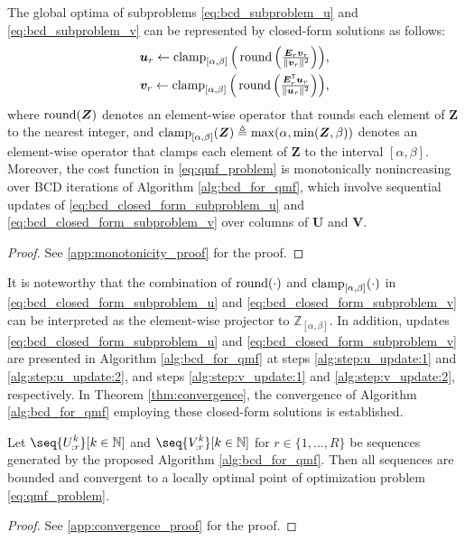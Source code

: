\begin{theorem}[Monotonicity] \label{the:bcd_subproblem}
    The global optima of subproblems \eqref{eq:bcd_subproblem_u} and \eqref{eq:bcd_subproblem_v} can be represented by closed-form solutions as follows:
    \begin{align}
        \textstyle \bm{u}_r \gets \operatorname{clamp}_{[\alpha,\beta]}\Big(\operatorname{round}\Big(\frac{\bm{E}_r \bm{v}_r}{\lVert \bm{v}_r \rVert^2}\Big)\Big), \label{eq:bcd_closed_form_subproblem_u} \\
        \textstyle \bm{v}_r \gets \operatorname{clamp}_{[\alpha,\beta]}\Big(\operatorname{round}\Big(\frac{\bm{E}_r^\mathsf{T} \bm{u}_r}{\lVert \bm{u}_r \rVert^2}\Big)\Big),
        \label{eq:bcd_closed_form_subproblem_v}
    \end{align}
    where $\operatorname{round}(\bm{Z})$ denotes an element-wise operator that rounds each element of $\bm{Z}$ to the nearest integer, and $\operatorname{clamp}_{[\alpha,\beta]}(\bm{Z}) \triangleq \max(\alpha, \min(\bm{Z}, \beta))$ denotes an element-wise operator that clamps each element of $\bm{Z}$ to the interval $[\alpha,\beta]$. Moreover, the cost function in \eqref{eq:qmf_problem} is monotonically nonincreasing over BCD iterations of Algorithm \ref{alg:bcd_for_qmf}, which involve sequential updates of \eqref{eq:bcd_closed_form_subproblem_u} and \eqref{eq:bcd_closed_form_subproblem_v} over columns of $\bm U$ and $\bm V$.
\end{theorem}
\begin{proof}
    See \ref{app:monotonicity_proof} for the proof.
\end{proof}

It is noteworthy that the combination of $\operatorname{round}(\cdot)$ and $\operatorname{clamp}_{[\alpha,\beta]}(\cdot)$ in \eqref{eq:bcd_closed_form_subproblem_u} and \eqref{eq:bcd_closed_form_subproblem_v} can be interpreted as the element-wise projector to $\mathbb{Z}_{[\alpha,\beta]}$. In addition, updates \eqref{eq:bcd_closed_form_subproblem_u} and \eqref{eq:bcd_closed_form_subproblem_v} are presented in Algorithm \ref{alg:bcd_for_qmf} at steps \ref{alg:step:u_update:1} and \ref{alg:step:u_update:2}, and steps \ref{alg:step:v_update:1} and \ref{alg:step:v_update:2}, respectively. In Theorem \ref{thm:convergence}, the convergence of Algorithm \ref{alg:bcd_for_qmf} employing these closed-form solutions is established.

\begin{theorem}[Convergence]\label{thm:convergence}
    Let $\seq{\displaystyle U_{:r}^{k}}[k\in\N]$ and $\seq{\displaystyle V_{:r}^{k}}[k\in\N]$ for $r\in \{1,\dots,R\}$ be sequences generated by the proposed Algorithm \ref{alg:bcd_for_qmf}. Then all sequences are bounded and convergent to a locally optimal point of optimization problem \eqref{eq:qmf_problem}.
\end{theorem}
\begin{proof}
    See \ref{app:convergence_proof} for the proof.
\end{proof}

